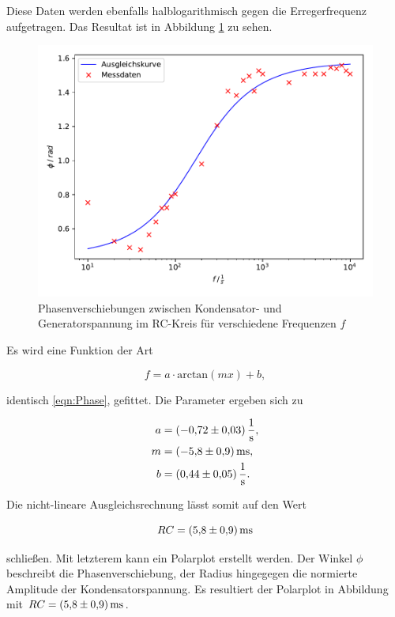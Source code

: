 Diese Daten werden ebenfalls halblogarithmisch gegen die Erregerfrequenz 
aufgetragen. Das Resultat ist in Abbildung \ref{fig:plot3} zu sehen. 

\begin{figure}
  \centering
  \includegraphics[scale=0.8]{content/plot3.pdf}
  \caption{Phasenverschiebungen zwischen Kondensator- und Generatorspannung
  im RC-Kreis für verschiedene Frequenzen $f$}
  \label{fig:plot3}
\end{figure}

Es wird eine Funktion der Art 

\begin{equation*}
f = a\cdot\text{arctan}(mx)+b,
\end{equation*}

identisch \eqref{eqn:Phase}, gefittet. Die Parameter ergeben sich zu 

\begin{align*}
a &= \SI{-0.72+-0.03}{\per\second},\\
m &= \SI{-5.8+-0.9}{\milli\second},\\
b &= \SI{0.44+-0.05}{\per\second}.
\end{align*}

Die nicht-lineare Ausgleichsrechnung lässt somit auf den Wert

\begin{equation*}
RC = \SI{5.8+-0.9}{\milli\second}
\end{equation*}

schließen.
Mit letzterem kann ein Polarplot erstellt werden. Der Winkel $\phi$ beschreibt 
die Phasenverschiebung, der Radius hingegegen die normierte Amplitude der
Kondensatorspannung. Es resultiert der Polarplot in Abbildung mit 
$RC = \SI{5.8+-0.9}{\milli\second}$.

